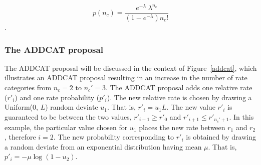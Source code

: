\documentclass[12pt]{article}
\newcommand{\ncat}{n_c}
\newcommand{\newprobmean}{\mu}
\begin{document}
\[ p(\ncat) = \frac{e^{-\lambda} \; \lambda^{\ncat}}{\left( 1 - e^{-\lambda} \right) {\ncat}!}  \].

%


\subsubsection{The ADDCAT proposal}

The ADDCAT proposal will be discussed in the context of Figure~\ref{addcat}, which illustrates an ADDCAT proposal resulting in an increase in the number of rate categories from $\ncat = 2$ to $\ncat' = 3$. The ADDCAT proposal adds one relative rate ($r'_i$) and one rate probability ($p'_i$). The new relative rate is chosen by drawing a Uniform(0, $L$) random deviate $u_1$. That is, $r'_i = u_1 L$. The new value $r'_i$ is guaranteed to be between the two values, $r'_{i-1} \ge r'_0$ and $r'_{i+1} \le r'_{\ncat'+1}$. In this example, the particular value chosen for $u_1$ places the new rate between $r_1$ and $r_2$, therefore $i=2$. The new probability corresponding to $r'_i$ is obtained by drawing a random deviate from an exponential distribution having mean $\newprobmean$. That is, $p'_i = -\newprobmean \log(1 - u_2)$.
\end{document}

